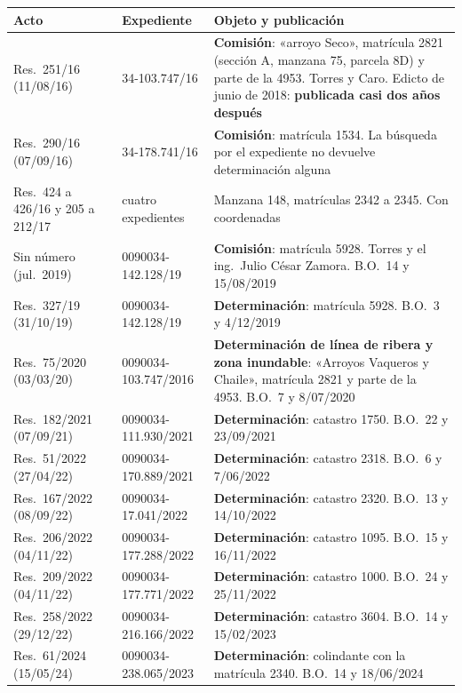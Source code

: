 {\small
\setlength{\LTpre}{0.6em}\setlength{\LTpost}{1.2em}
\begin{longtable}{@{}p{2.4cm}p{3.3cm}p{6.2cm}@{}}
\toprule
\textbf{Acto} & \textbf{Expediente} & \textbf{Objeto y publicación} \\
\midrule
\endhead
Res.\ 251/16 (11/08/16) & 34-103.747/16 & \textbf{Comisión}: «arroyo Seco», matrícula 2821 (sección A, manzana 75, parcela 8D) y parte de la 4953. Torres y Caro. Edicto de junio de 2018: \textbf{publicada casi dos años después} \\
Res.\ 290/16 (07/09/16) & 34-178.741/16 & \textbf{Comisión}: matrícula 1534. La búsqueda por el expediente no devuelve determinación alguna \\
Res.\ 424 a 426/16 y 205 a 212/17 & cuatro expedientes & Manzana 148, matrículas 2342 a 2345. Con coordenadas \\
Sin número (jul.\ 2019) & 0090034-142.128/19 & \textbf{Comisión}: matrícula 5928. Torres y el ing.\ Julio César Zamora. B.O.\ 14 y 15/08/2019 \\
Res.\ 327/19 (31/10/19) & 0090034-142.128/19 & \textbf{Determinación}: matrícula 5928. B.O.\ 3 y 4/12/2019 \\
Res.\ 75/2020 (03/03/20) & 0090034-103.747/2016 & \textbf{Determinación de línea de ribera y zona inundable}: «Arroyos Vaqueros y Chaile», matrícula 2821 y parte de la 4953. B.O.\ 7 y 8/07/2020 \\
Res.\ 182/2021 (07/09/21) & 0090034-111.930/2021 & \textbf{Determinación}: catastro 1750. B.O.\ 22 y 23/09/2021 \\
Res.\ 51/2022 (27/04/22) & 0090034-170.889/2021 & \textbf{Determinación}: catastro 2318. B.O.\ 6 y 7/06/2022 \\
Res.\ 167/2022 (08/09/22) & 0090034-17.041/2022 & \textbf{Determinación}: catastro 2320. B.O.\ 13 y 14/10/2022 \\
Res.\ 206/2022 (04/11/22) & 0090034-177.288/2022 & \textbf{Determinación}: catastro 1095. B.O.\ 15 y 16/11/2022 \\
Res.\ 209/2022 (04/11/22) & 0090034-177.771/2022 & \textbf{Determinación}: catastro 1000. B.O.\ 24 y 25/11/2022 \\
Res.\ 258/2022 (29/12/22) & 0090034-216.166/2022 & \textbf{Determinación}: catastro 3604. B.O.\ 14 y 15/02/2023 \\
Res.\ 61/2024 (15/05/24) & 0090034-238.065/2023 & \textbf{Determinación}: colindante con la matrícula 2340. B.O.\ 14 y 18/06/2024 \\
\bottomrule
\end{longtable}
}

